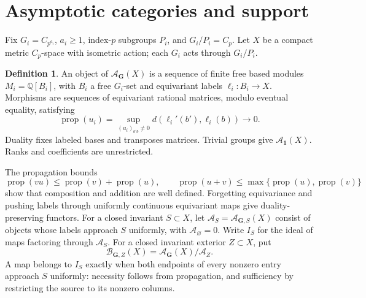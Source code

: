\documentclass[11pt]{amsart}
\numberwithin{equation}{section}
\theoremstyle{definition}
\newtheorem{definition}[definition]{Definition}
\theoremstyle{remark}
\DeclareMathOperator{\prop}{prop}
\newcommand{\Q}{\mathbb Q}
\begin{document}
\section{Asymptotic categories and support}\label{alg:categories}

Fix $G_i=C_{p^{a_i}}$, $a_i\ge1$, index-$p$ subgroups $P_i$, and
$G_i/P_i=C_p$. Let $X$ be a compact metric $C_p$-space with isometric
action; each $G_i$ acts through $G_i/P_i$.
\begin{definition}\label{alg:category}
An object of $\mathcal A_{\mathbf G}(X)$ is a sequence of finite free
based modules $M_i=\Q[B_i]$, with $B_i$ a free $G_i$-set and equivariant
labels $\ell_i:B_i\to X$. Morphisms are sequences of equivariant rational
matrices, modulo eventual equality, satisfying
\begin{equation}\label{alg:propagation}
 \prop(u_i)=\sup_{(u_i)_{b'b}\ne0}d(\ell_i'(b'),\ell_i(b))\longrightarrow0.
\end{equation}
Duality fixes labeled bases and transposes matrices. Trivial groups give
$\mathcal A_{\mathbf1}(X)$. Ranks and coefficients are unrestricted.
\end{definition}

The propagation bounds
\begin{equation}\label{alg:propbounds}
 \prop(vu)\le\prop(v)+\prop(u),\qquad
 \prop(u+v)\le\max\{\prop(u),\prop(v)\}
\end{equation}
show that composition and addition are well defined. Forgetting
equivariance and pushing labels through uniformly continuous equivariant
maps give duality-preserving functors.
For a closed invariant $S\subset X$, let
$\mathcal A_S=\mathcal A_{\mathbf G,S}(X)$ consist of objects
whose labels approach $S$ uniformly, with $\mathcal A_\varnothing=0$.
Write $I_S$ for the ideal of maps factoring through $\mathcal A_S$.
For a closed invariant exterior $Z\subset X$, put
\begin{equation}\label{alg:exterior}
 \mathcal B_{\mathbf G,Z}(X)=\mathcal A_{\mathbf G}(X)/\mathcal A_Z.
\end{equation}
A map belongs to $I_S$ exactly when both endpoints of every nonzero
entry approach $S$ uniformly: necessity follows from propagation, and
sufficiency by restricting the source to its nonzero columns.
\end{document}
